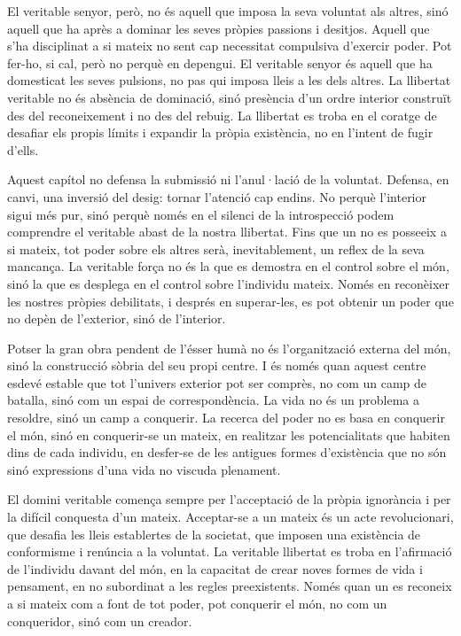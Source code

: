 El veritable senyor, però, no és aquell que imposa la seva voluntat als altres, sinó aquell que ha après a dominar les seves pròpies passions i desitjos. Aquell que s’ha disciplinat a si mateix no sent cap necessitat compulsiva d’exercir poder. Pot fer-ho, si cal, però no perquè en depengui. El veritable senyor és aquell que ha domesticat les seves pulsions, no pas qui imposa lleis a les dels altres. La llibertat veritable no és absència de dominació, sinó presència d’un ordre interior construït des del reconeixement i no des del rebuig. La llibertat es troba en el coratge de desafiar els propis límits i expandir la pròpia existència, no en l’intent de fugir d’ells.

Aquest capítol no defensa la submissió ni l’anul·lació de la voluntat. Defensa, en canvi, una inversió del desig: tornar l’atenció cap endins. No perquè l’interior sigui més pur, sinó perquè només en el silenci de la introspecció podem comprendre el veritable abast de la nostra llibertat. Fins que un no es posseeix a si mateix, tot poder sobre els altres serà, inevitablement, un reflex de la seva mancança. La veritable força no és la que es demostra en el control sobre el món, sinó la que es desplega en el control sobre l’individu mateix. Només en reconèixer les nostres pròpies debilitats, i després en superar-les, es pot obtenir un poder que no depèn de l’exterior, sinó de l’interior.

Potser la gran obra pendent de l’ésser humà no és l’organització externa del món, sinó la construcció sòbria del seu propi centre. I és només quan aquest centre esdevé estable que tot l’univers exterior pot ser comprès, no com un camp de batalla, sinó com un espai de correspondència. La vida no és un problema a resoldre, sinó un camp a conquerir. La recerca del poder no es basa en conquerir el món, sinó en conquerir-se un mateix, en realitzar les potencialitats que habiten dins de cada individu, en desfer-se de les antigues formes d’existència que no són sinó expressions d’una vida no viscuda plenament.

El domini veritable comença sempre per l’acceptació de la pròpia ignorància i per la difícil conquesta d’un mateix. Acceptar-se a un mateix és un acte revolucionari, que desafia les lleis establertes de la societat, que imposen una existència de conformisme i renúncia a la voluntat. La veritable llibertat es troba en l’afirmació de l’individu davant del món, en la capacitat de crear noves formes de vida i pensament, en no subordinat a les regles preexistents. Només quan un es reconeix a si mateix com a font de tot poder, pot conquerir el món, no com un conqueridor, sinó com un creador.